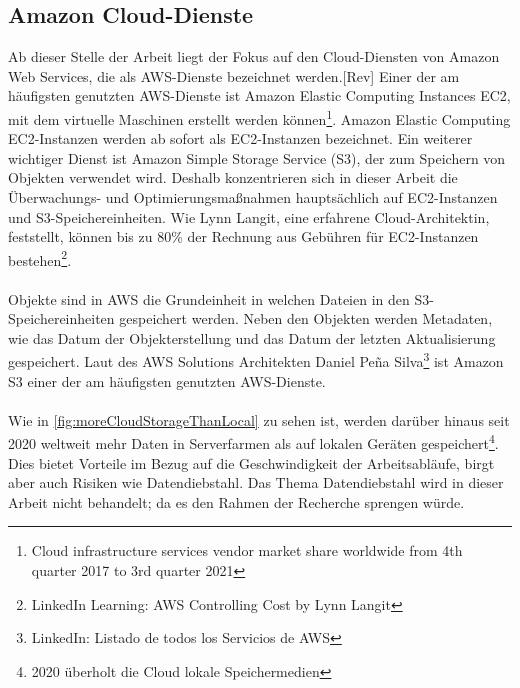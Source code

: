 \subsection{Amazon Cloud-Dienste}
Ab dieser Stelle der Arbeit liegt der Fokus auf den Cloud-Diensten von Amazon Web Services, die als AWS-Dienste bezeichnet werden.[Rev]
Einer der am häufigsten genutzten AWS-Dienste ist Amazon Elastic Computing Instances EC2, mit dem virtuelle Maschinen erstellt werden können\footnote{\cite{STA4} Cloud infrastructure services vendor market share worldwide from 4th quarter 2017 to 3rd quarter 2021}. Amazon Elastic Computing EC2-Instanzen werden ab sofort als EC2-Instanzen bezeichnet. Ein weiterer wichtiger Dienst ist Amazon Simple Storage Service (S3), der zum Speichern von Objekten verwendet wird. Deshalb konzentrieren sich in dieser Arbeit die Überwachungs- und Optimierungsmaßnahmen hauptsächlich auf EC2-Instanzen und S3-Speichereinheiten. %
Wie Lynn Langit, eine erfahrene Cloud-Architektin, feststellt, können bis zu 80\% der Rechnung aus Gebühren für EC2-Instanzen bestehen\footnote{\cite{LINK2}LinkedIn Learning: AWS Controlling Cost by Lynn Langit}.%
\\\\
Objekte sind in AWS die Grundeinheit in welchen Dateien in den S3-Speichereinheiten gespeichert werden. Neben den Objekten werden Metadaten, wie das Datum der Objekterstellung und das Datum der letzten Aktualisierung gespeichert. Laut 
des AWS Solutions Architekten Daniel Peña Silva\footnote{\cite{LINK1}LinkedIn: Listado de todos los Servicios de AWS} ist Amazon S3 einer der am häufigsten genutzten AWS-Dienste.
\\\\
Wie in \autoref{fig:moreCloudStorageThanLocal} zu sehen ist, werden darüber hinaus seit 2020 weltweit mehr Daten in Serverfarmen als auf lokalen Geräten gespeichert\footnote{\cite{STA1}2020 überholt die Cloud lokale Speichermedien}. Dies bietet Vorteile im Bezug auf die Geschwindigkeit der Arbeitsabläufe, birgt aber auch Risiken wie Datendiebstahl. Das Thema Datendiebstahl wird in dieser Arbeit nicht behandelt; da es den Rahmen der Recherche sprengen würde.
